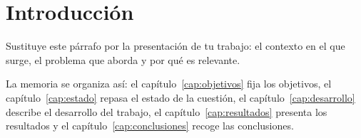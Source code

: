 \chapter{Introducción}\label{cap:introduccion}

Sustituye este párrafo por la presentación de tu trabajo: el contexto en el
que surge, el problema que aborda y por qué es relevante.

La memoria se organiza así: el capítulo~\ref{cap:objetivos} fija los objetivos,
el capítulo~\ref{cap:estado} repasa el estado de la cuestión, el
capítulo~\ref{cap:desarrollo} describe el desarrollo del trabajo, el
capítulo~\ref{cap:resultados} presenta los resultados y el
capítulo~\ref{cap:conclusiones} recoge las conclusiones.
